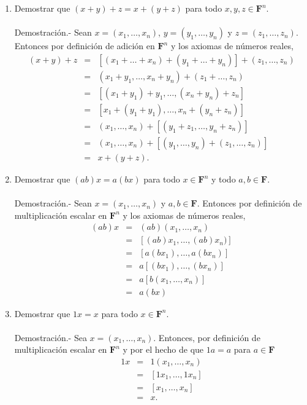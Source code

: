 \begin{enumerate}[\bfseries 1.]
    \item Demostrar que $(x+y)+z=x+(y+z)$ para todo $x,y,z\in \textbf{F}^n.$\\\\
	Demostración.-\; Sean $x=(x_1,\ldots,x_n)$, $y=(y_1,\ldots , y_n)$ y $z=(z_1,\ldots , z_n)$. Entonces por definición de adición en $\textbf{F}^n$ y los axiomas de números reales,
	$$\begin{array}{rcl}
	    (x+y)+z & = & \left[(x_1+\ldots+x_n)+(y_1+\ldots + y_n)\right]+(z_1,\ldots , z_n)\\
		    & = & (x_1+y_1,\ldots ,x_n+y_n)+(z_1+\ldots, z_n)\\
		    & = & \left[(x_1+y_1)+y_1,\ldots ,(x_n+y_n)+z_n\right]\\
		    & = & \left[x_1+(y_1+y_1),\ldots ,x_n+(y_n+z_n)\right]\\
		    & = & (x_1,\ldots,x_n)+\left[(y_1+z_1,\ldots, y_n+z_n)\right]\\
		    & = & (x_1,\ldots,x_n)+\left[(y_1,\ldots, y_n)+(z_1,\ldots,z_n)\right]\\
		    & = & x+(y+z).
	\end{array}$$
	\vspace{.5cm}

    \item Demostrar que $(ab)x=a(bx)$ para todo $x\in \textbf{F}^n$ y todo $a,b\in \textbf{F}$.\\\\
	Demostración.-\; Sean $x=(x_1,\ldots,x_n)$ y $a,b\in \textbf{F}$. Entonces por definición de multiplicación escalar en $\textbf{F}^n$ y los axiomas de números reales,
	$$\begin{array}{rcl}
	    (ab)x&=&(ab)(x_1,\ldots,x_n)\\
		 &=&\left[(ab)x_1,\ldots,(ab)x_n)\right]\\
		 &=&\left[a(bx_1),\ldots,a(bx_n)\right]\\
		 &=&a\left[(bx_1),\ldots,(bx_n)\right]\\
		 &=&a\left[b(x_1,\ldots,x_n)\right]\\
		 &=&a(bx)
	\end{array}$$
	\vspace{.5cm}

    \item Demostrar que $1x=x$ para todo $x\in \textbf{F}^n$.\\\\
	Demostración.-\; Sea $x=(x_1,\ldots,x_n)$. Entonces, por definición de multiplicación escalar en $\textbf{F}^n$ y por el hecho de que $1a=a$ para $a\in \textbf{F}$
	$$\begin{array}{rcl}
	    1x&=&1(x_1,\ldots,x_n)\\
		 &=&\left[1x_1,\ldots,1x_n\right]\\
		 &=&\left[x_1,\ldots,x_n\right]\\
		 &=&x.
	\end{array}$$
	\vspace{.5cm}


\end{enumerate}

